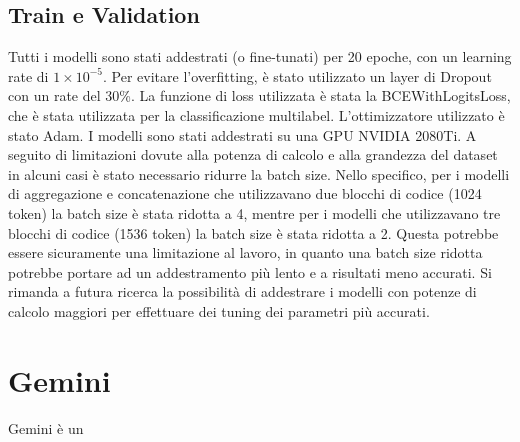 \documentclass[../../Thesis.tex]{subfiles}
\begin{document}
\subsection{Train e Validation}
Tutti i modelli sono stati addestrati (o fine-tunati) per 20 epoche, con un learning rate di $1 \times 10^{-5}$. Per evitare l'overfitting, è stato utilizzato un layer di Dropout con un rate del 30\%. La funzione di loss utilizzata è stata la BCEWithLogitsLoss, che è stata utilizzata per la classificazione multilabel. L'ottimizzatore utilizzato è stato Adam. I modelli sono stati addestrati su una GPU NVIDIA 2080Ti. A seguito di limitazioni dovute alla potenza di calcolo e alla grandezza del dataset in alcuni casi è stato necessario ridurre la batch size. Nello specifico, per i modelli di aggregazione e concatenazione che utilizzavano due blocchi di codice (1024 token) la batch size è stata ridotta a 4, mentre per i modelli che utilizzavano tre blocchi di codice (1536 token) la batch size è stata ridotta a 2. Questa potrebbe essere sicuramente una limitazione al lavoro, in quanto una batch size ridotta potrebbe portare ad un addestramento più lento e a risultati meno accurati. Si rimanda a futura ricerca la possibilità di addestrare i modelli con potenze di calcolo maggiori per effettuare dei tuning dei parametri più accurati. 

\section{Gemini}
Gemini è un 
\end{document}

